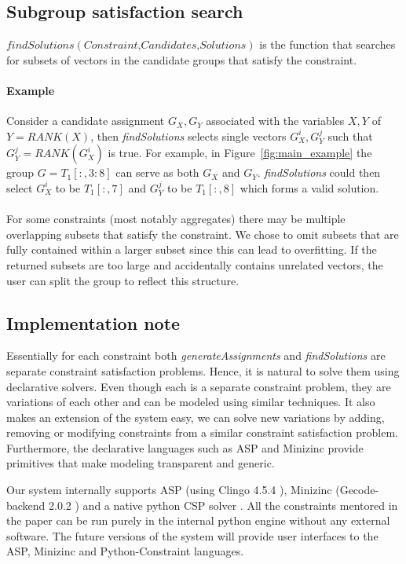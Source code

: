 \documentclass{ecai}
\newcommand{\format}[1]{\textit{#1}\xspace}
\newcommand{\generategroups}{\format{generateAssignments}}
\newcommand{\findassignment}{\format{findSolutions}}
\newcommand{\range}[3]{\ensuremath{#1[#2,#3]}}
\newcommand{\rangeto}[2]{#1{:}#2}
\newcommand{\rangeall}{:}
\newcommand{\ecrank}[2]{\ensuremath{#1 = \mathit{RANK}(#2)}}
\begin{document}
\subsection{Subgroup satisfaction search}
$\findassignment(\textit{Constraint,Candidates,Solutions})$ is the function that searches for subsets of vectors in the candidate groups that satisfy the constraint.

\paragraph{Example}
Consider a candidate assignment $G_X, G_Y$ associated with the variables $X,Y$ of \ecrank{Y}{X}, then \findassignment selects single vectors $G_X^{i}, G_Y^{j}$ such that \ecrank{G_Y^{j}}{G_X^{i}} is true.
For example, in Figure~\ref{fig:main_example} the group $G = \range{T_1}{\rangeall}{\rangeto{3}{8}}$ can serve as both $G_X$ and $G_Y$.
\findassignment could then select $G_X^{i}$ to be $\range{T_1}{\rangeall}{7}$ and $G_Y^{j}$ to be $\range{T_1}{\rangeall}{8}$ which forms a valid solution.
\\\\
For some constraints (most notably aggregates) there may be multiple overlapping subsets that satisfy the constraint.
We chose to omit subsets that are fully contained within a larger subset since this can lead to overfitting.
If the returned subsets are too large and accidentally contains unrelated vectors, the user can split the group to reflect this structure.

\subsection{Implementation note} Essentially for each constraint both \generategroups and \findassignment are separate constraint satisfaction problems. Hence, it is natural to solve them using declarative solvers. Even though each is a separate constraint problem, they are variations of each other and can be modeled using similar techniques. It also makes an extension of the system easy, we can solve new variations by adding, removing or modifying constraints from a similar constraint satisfaction problem. Furthermore, the declarative languages such as ASP \cite{whaisasp} and Minizinc \cite{minizinc} provide primitives that make modeling transparent and generic.

Our system internally supports ASP (using Clingo 4.5.4 \cite{clingo}), Minizinc (Gecode-backend 2.0.2 \cite{minizinc}) and a native python CSP solver \cite{python_constraint}. All the constraints mentored in the paper can be run purely in the internal python engine without any external software. The future versions of the system will provide user interfaces to the ASP, Minizinc and Python-Constraint languages.
\end{document}
